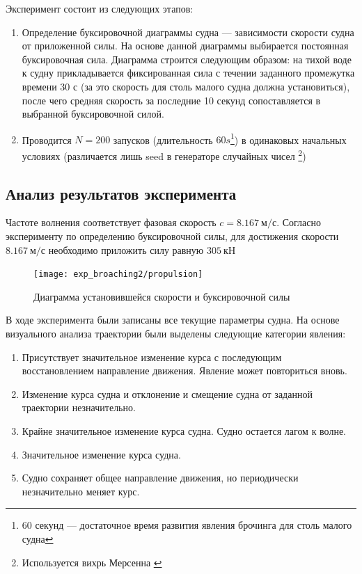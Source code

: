 Эксперимент состоит из следующих этапов:
\begin{enumerate}
	\item	Определение буксировочной диаграммы судна --- зависимости скорости судна от приложенной силы. 
			На основе данной диаграммы выбирается постоянная буксировочная сила. 
			Диаграмма строится следующим образом: на тихой воде к судну прикладывается фиксированная 
			сила с течении заданного промежутка времени 30 с (за это скорость для столь малого судна 
			должна установиться), после чего средняя скорость за последние 10 секунд 
			сопоставляется в выбранной буксировочной силой.
	\item	Проводится $N=200$ запусков (длительность $60 s$\footnote{60 секунд --- достаточное время развития явления брочинга для столь малого судна}) в одинаковых начальных условиях (различается лишь seed в генераторе случайных чисел \footnote{Используется вихрь Мерсенна \citep{mersenn_twister}})
\end{enumerate}



\subsection{Анализ результатов эксперимента}

Частоте волнения соответствует фазовая скорость $c = 8.167\ \text{м/с}$.
Согласно эксперименту по определению буксировочной силы, для достижения скорости $8.167\ \text{м/с}$ необходимо приложить силу равную $305\ \text{кН}$

\begin{figure}[ht]
	\begin{center}
	\texttt{[image: exp\_broaching2/propulsion]}
	\end{center}
	\caption{Диаграмма установившейся скорости и буксировочной силы}
	\label{tug_force}
\end{figure}

В ходе эксперимента были записаны все текущие параметры судна. На основе визуального анализа траектории были выделены следующие категории явления:

\begin{enumerate}
	\item	Присутствует значительное изменение курса с последующим восстановлением направление движения. 
			Явление может повториться вновь.
	\item	Изменение курса судна и отклонение и смещение судна от заданной траектории незначительно.
	\item	Крайне значительное изменение курса судна. Судно остается лагом к волне.
	\item	Значительное изменение курса судна.
	\item	Судно сохраняет общее направление движения, но периодически незначительно меняет курс.
\end{enumerate}

